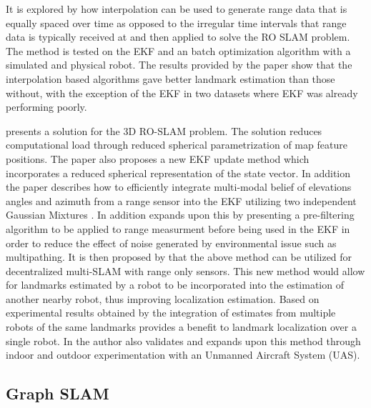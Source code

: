 \documentclass[conference]{IEEEtran}
\begin{document}
	
	
	
	It is explored by \cite{Kehagias2006} how interpolation can be used to generate range data that is equally spaced over time as opposed to the irregular time intervals that range data is typically received at and then applied to solve the RO SLAM problem. The method is tested on the EKF and an batch optimization algorithm with a simulated and physical robot. The results provided by the paper show that the interpolation based algorithms gave better landmark estimation than those without, with the exception of the EKF in two datasets where EKF was already performing poorly.
	
	
	
	
	
	\cite{Fabresse2013} presents a solution for the 3D RO-SLAM problem. The solution reduces computational load through reduced spherical parametrization of map feature positions. The paper also proposes a new EKF update method which incorporates a reduced spherical representation of the state vector. In addition the paper describes how to efficiently integrate multi-modal belief of elevations angles and azimuth from a range sensor into the EKF utilizing two independent Gaussian Mixtures \cite{Fabresse2013}. In addition \cite{Fabresse2014} expands upon this by presenting a pre-filtering algorithm to be applied to range measurment before being used in the EKF in order to reduce the effect of noise generated by environmental issue such as multipathing. It is then proposed by \cite{Fabresse2015} that the above method can be utilized for decentralized multi-SLAM with range only sensors. This new method would allow for landmarks estimated by a robot to be incorporated into the estimation of another nearby robot, thus improving localization estimation. Based on experimental results obtained by \cite{Fabresse2015} the integration of estimates from multiple robots of the same landmarks provides a benefit to landmark localization over a single robot. In \cite{Fabresse2016} the author also validates and expands upon this method through indoor and outdoor experimentation with an Unmanned Aircraft System (UAS).  
	
	
	
	
	
	\subsection{Graph SLAM}
	
\end{document}
